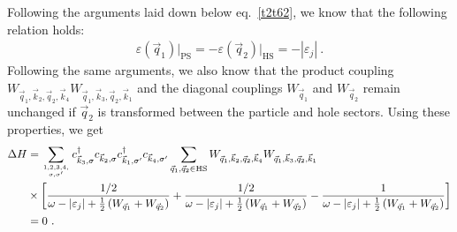 \documentclass{revtex4-2}
\begin{document}
Following the arguments laid down below eq.~\ref{t2t62}, we know that the following relation holds:
\begin{equation}\begin{aligned}
	\varepsilon(\vec q_1)\bigg|_\text{PS} = -\varepsilon(\vec q_2)\bigg|_\text{HS} = -|\varepsilon_j|~.
\end{aligned}\end{equation}
Following the same arguments, we also know that the product coupling \(W_{\vec q_1,\vec k_2, \vec q_2, \vec k_4} W_{\vec q_1,\vec k_3, \vec q_2, \vec k_1}\) and the diagonal couplings \(W_{\vec q_1}\) and \(W_{\vec q_2}\) remain unchanged if \(\vec q_2\) is transformed between the particle and hole sectors. Using these properties, we get
\begin{equation}\begin{aligned}
	\Delta H &= \sum_{1,2,3,4,\atop{\sigma,\sigma^\prime}} c^\dagger_{\vec k_3,\sigma} c_{\vec k_2,\sigma} c^\dagger_{\vec k_1,\sigma^\prime}c_{\vec k_4,\sigma^\prime}\sum_{\vec q_1, \vec q_2 \in \text{HS}}W_{\vec q_1,\vec k_2, \vec q_2, \vec k_4} W_{\vec q_1,\vec k_3, \vec q_2, \vec k_1}\\
		 &\times\left[\frac{1/2}{\omega - |\varepsilon_j| + \frac{1}{2}\left(W_{\vec q_1} + W_{\vec q_2}\right)} + \frac{1/2}{\omega - |\varepsilon_j| + \frac{1}{2}\left(W_{\vec q_1} + W_{\vec q_2}\right)} - \frac{1}{\omega - |\varepsilon_j| + \frac{1}{2}\left(W_{\vec q_1} + W_{\vec q_2}\right)} \right]\\
		 &= 0~.
\end{aligned}\end{equation}
\end{document}
